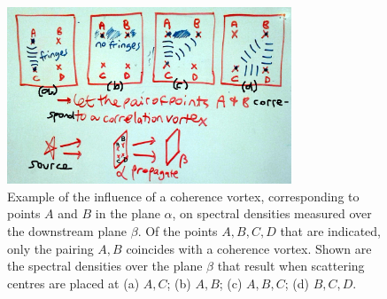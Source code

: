 \documentclass[%
 reprint,
 amsmath,amssymb,
 aps,
]{revtex4-1}
\begin{document}
\begin{figure}
\includegraphics[width=8.5cm]{Figures/ABCD.png}
\caption{Example of the influence of a coherence vortex, corresponding to points $A$ and $B$ in the plane $\alpha$, on spectral densities measured over the downstream plane $\beta$.  Of the points $A,B,C,D$ that are indicated, only the pairing $A,B$ coincides with a coherence vortex.  Shown are the spectral densities over the plane $\beta$ that result when scattering centres are placed at (a) $A,C$; (b) $A,B$; (c) $A,B,C$; (d) $B,C,D$.}
\label{fig:ABCD}
\end{figure}
\end{document}
